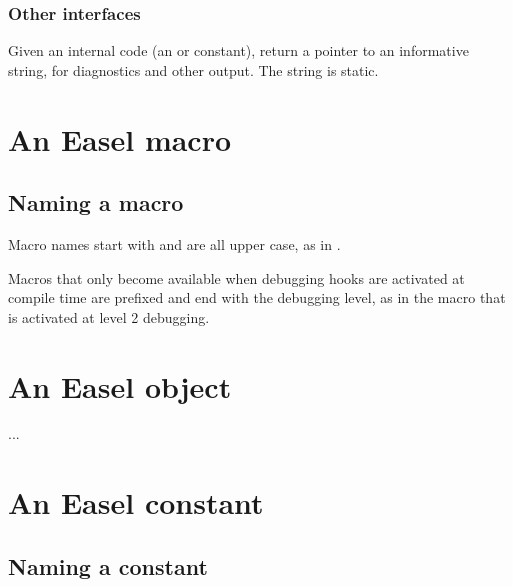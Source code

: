 \subsubsection{Other interfaces}

\begin{sreapi}
\hypertarget{ifc:Describe}
{\item[\ccode{\_DescribeXXX()}]}

Given an internal code (an  or  constant),
return a pointer to an informative string, for diagnostics and other
output. The string is static.
\end{sreapi}




\section{An Easel macro}

   \subsection{Naming a macro}

Macro names start with  and are all upper case, as in
.

Macros that only become available when debugging hooks are activated
at compile time are prefixed and end with the debugging
level, as in the  macro that is activated at
level 2 debugging.

\section{An Easel object}

...



\section{An Easel constant}

 \subsection{Naming a constant}

